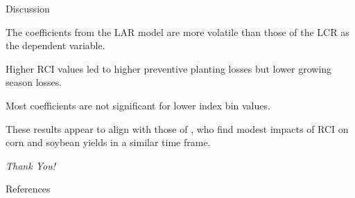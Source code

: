 \documentclass[notes, 11pt, aspectratio=169]{beamer}
\newenvironment{wideitemize}{\itemize\addtolength{\itemsep}{10pt}}{\enditemize}
\begin{document}
\begin{frame}{Discussion}
    \begin{wideitemize}
        \item The coefficients from the LAR model are more volatile than those of the LCR as the dependent variable.
        \item Higher RCI values led to higher preventive planting losses but lower growing season losses.
        \item Most coefficients are not significant for lower index bin values.
        \item These results appear to align with those of \cite{burchfield2024}, who find modest impacts of RCI on corn and soybean yields in a similar time frame.
    \end{wideitemize}
\end{frame}

\begin{frame}{}
	\centering \Huge
	\emph{Thank You!}
\end{frame}
	
\begin{frame}[allowframebreaks]{References}
		
\end{frame}	
\end{document}
